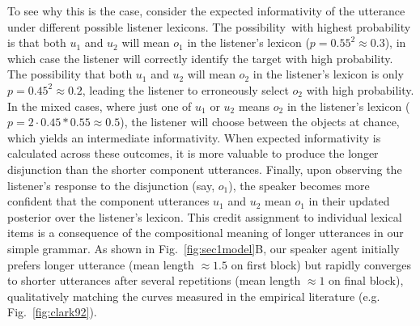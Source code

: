To see why this is the case, consider the expected informativity of the utterance under different possible listener lexicons.
The possibility with highest probability is that both $u_1$ and $u_2$ will mean $o_1$ in the listener's lexicon ($p = 0.55^2 \approx 0.3$), in which case the listener will correctly identify the target with high probability.
The possibility that both $u_1$ and $u_2$ will mean $o_2$ in the listener's lexicon is only $p=0.45^2 \approx 0.2$, leading the listener to erroneously select $o_2$ with high probability. 
In the mixed cases, where just one of $u_1$ or $u_2$ means $o_2$ in the listener's lexicon ($p = 2 \cdot 0.45 * 0.55 \approx 0.5$), the listener will choose between the objects at chance, which yields an intermediate informativity.
When expected informativity is calculated across these outcomes, it is more valuable to produce the longer disjunction than the shorter component utterances.
Finally, upon observing the listener's response to the disjunction (say, $o_1$), the speaker becomes more confident that the component utterances $u_1$ and $u_2$ mean $o_1$ in their updated posterior over the listener's lexicon.
This credit assignment to individual lexical items is a consequence of the compositional meaning of longer utterances in our simple grammar.
As shown in Fig.~\ref{fig:sec1model}B, our speaker agent initially prefers longer utterance (mean length $\approx 1.5$ on first block) but rapidly converges to shorter utterances after several repetitions (mean length $\approx 1$ on final block), qualitatively matching the curves measured in the empirical literature (e.g. Fig.~\ref{fig:clark92}).

